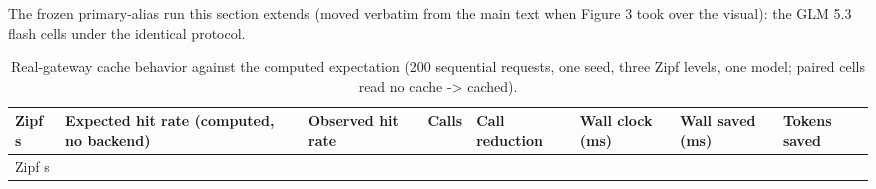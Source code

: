 \documentclass[
  11pt,
]{article}
\begin{document}
The frozen primary-alias run this section extends (moved verbatim from
the main text when Figure 3 took over the visual): the GLM 5.3 flash
cells under the identical protocol.

\begin{longtable}[]{@{}
  >{\raggedright\arraybackslash}p{}
  >{\raggedright\arraybackslash}p{}
  >{\raggedright\arraybackslash}p{}
  >{\raggedright\arraybackslash}p{}
  >{\raggedright\arraybackslash}p{}
  >{\raggedright\arraybackslash}p{}
  >{\raggedright\arraybackslash}p{}
  >{\raggedright\arraybackslash}p{}@{}}
\caption{Real-gateway cache behavior against the computed expectation
(200 sequential requests, one seed, three Zipf levels, one model; paired
cells read no cache -\textgreater{} cached).}\tabularnewline
\toprule\noalign{}
\begin{minipage}[b]{\linewidth}\raggedright
Zipf s
\end{minipage} & \begin{minipage}[b]{\linewidth}\raggedright
Expected hit rate (computed, no backend)
\end{minipage} & \begin{minipage}[b]{\linewidth}\raggedright
Observed hit rate
\end{minipage} & \begin{minipage}[b]{\linewidth}\raggedright
Calls
\end{minipage} & \begin{minipage}[b]{\linewidth}\raggedright
Call reduction
\end{minipage} & \begin{minipage}[b]{\linewidth}\raggedright
Wall clock (ms)
\end{minipage} & \begin{minipage}[b]{\linewidth}\raggedright
Wall saved (ms)
\end{minipage} & \begin{minipage}[b]{\linewidth}\raggedright
Tokens saved
\end{minipage} \\
\midrule\noalign{}
\endfirsthead
\toprule\noalign{}
\begin{minipage}[b]{\linewidth}\raggedright
Zipf s
\end{minipage} & \begin{minipage}[b]{\linewidth}\raggedright

\end{minipage}
\end{longtable}
\end{document}

